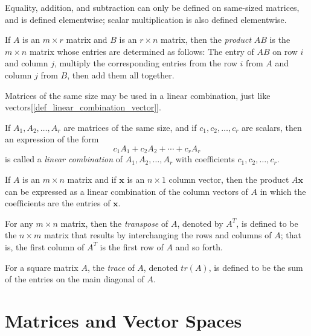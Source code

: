 \documentclass{report}
\begin{document}
			Equality, addition, and subtraction can only be defined on same-sized matrices, and is defined elementwise; scalar multiplication is also defined elementwise.
			
			\begin{defn}
				If $A$ is an $m \times r$ matrix and $B$ is an $r \times n$ matrix, then the \emph{product} $AB$ is the $m \times n$ matrix whose entries are determined as follows:
				The entry of $AB$ on row $i$ and column $j$, multiply the corresponding entries from the row $i$ from $A$ and column $j$ from $B$, then add them all together.
			\end{defn}
		
			Matrices of the same size may be used in a linear combination, just like vectors[\ref{def_linear_combination_vector}].
			
			\begin{defn}
				If $A_1, A_2, \dots, A_r$ are matrices of the same size, and if $c_1, c_2, \dots, c_r$ are scalars, then an expression of the form
				\begin{displaymath}
					c_1A_1+c_2A_2+\cdots+c_rA_r
				\end{displaymath}
				is called a \emph{linear combination} of $A_1, A_2, \dots, A_r$ with coefficients $c_1, c_2, \dots, c_r$.
			\end{defn}
			
			\begin{thm}
				If $A$ is an $m \times n$ matrix and if $\bm{x}$ is an $n \times 1$ column vector, then the product $A\bm{x}$ can be expressed as a linear combination of the column vectors of $A$ in which the coefficients are the entries of $\bm{x}$.
			\end{thm}
			
			\begin{defn}[Transpose]
				For any $m \times n$ matrix, then the \emph{transpose} of $A$, denoted by $A^T$, is defined to be the $n \times m$ matrix that results by interchanging the rows and columns of $A$; that is, the first column of $A^T$ is the first row of $A$ and so forth.
			\end{defn}
			
			\begin{defn}[Trace]
				For a square matrix $A$, the \emph{trace} of $A$, denoted $tr(A)$, is defined to be the sum of the entries on the main diagonal of $A$.
			\end{defn}

	\section{Matrices and Vector Spaces}
\end{document}
